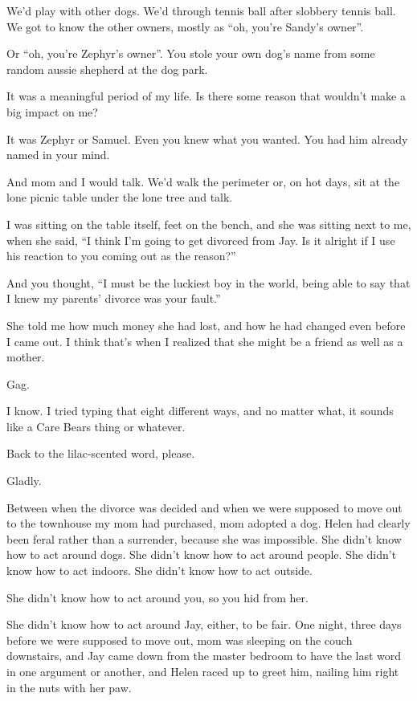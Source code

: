 We'd play with other dogs. We'd through tennis ball after slobbery tennis ball. We got to know the other owners, mostly as ``oh, you're Sandy's owner''.

\begin{ally}
Or ``oh, you're Zephyr's owner''. You stole your own dog's name from some random aussie shepherd at the dog park.
\end{ally}
It was a meaningful period of my life. Is there some reason that wouldn't make a big impact on me?

\begin{ally}
It was Zephyr or Samuel. Even you knew what you wanted. You had him already named in your mind.
\end{ally}
And mom and I would talk. We'd walk the perimeter or, on hot days, sit at the lone picnic table under the lone tree and talk.

I was sitting on the table itself, feet on the bench, and she was sitting next to me, when she said, ``I think I'm going to get divorced from Jay. Is it alright if I use his reaction to you coming out as the reason?''

\begin{ally}
And you thought, ``I must be the luckiest boy in the world, being able to say that I knew my parents' divorce was your fault.''
\end{ally}
She told me how much money she had lost, and how he had changed even before I came out. I think that's when I realized that she might be a friend as well as a mother.

\begin{ally}
Gag.
\end{ally}
I know. I tried typing that eight different ways, and no matter what, it sounds like a Care Bears thing or whatever.

\begin{ally}
Back to the lilac-scented word, please.
\end{ally}
Gladly.
\newpage

\noindent Between when the divorce was decided and when we were supposed to move out to the townhouse my mom had purchased, mom adopted a dog. Helen had clearly been feral rather than a surrender, because she was impossible. She didn't know how to act around dogs. She didn't know how to act around people. She didn't know how to act indoors. She didn't know how to act outside.

\begin{ally}
She didn't know how to act around you, so you hid from her.
\end{ally}
She didn't know how to act around Jay, either, to be fair. One night, three days before we were supposed to move out, mom was sleeping on the couch downstairs, and Jay came down from the master bedroom to have the last word in one argument or another, and Helen raced up to greet him, nailing him right in the nuts with her paw.

